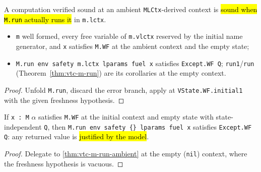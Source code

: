 \begin{theorem}
  \label{thm:vtc-m-run-ambient}
  \leanok

   A computation verified sound at an ambient \texttt{MLCtx}-derived context is
  \hl{sound when \texttt{M.run} actually runs it} in \texttt{m.lctx}.
  \begin{itemize}
  \item {} \texttt{m} well formed, every free variable of \texttt{m.vlctx} reserved by
    the initial name generator, and \texttt{x} satisfies \texttt{M.WF} at the ambient context and
    the empty state;
  \item {} \texttt{M.run env safety m.lctx lparams fuel x} satisfies
    \texttt{Except.WF Q}; \texttt{run1}/\texttt{run} (Theorem~\ref{thm:vtc-m-run}) are its
    corollaries at the empty context.
  \end{itemize}
\end{theorem}
\begin{proof}
  \leanok
   Unfold \texttt{M.run}, discard the error branch, apply at
  \texttt{VState.WF.initial1} with the given freshness hypothesis.
\end{proof}

\begin{theorem}
  \label{thm:vtc-m-run}
  \leanok

   If \texttt{x : M} $\alpha$ satisfies \texttt{M.WF} at the initial context and
  empty state with state-independent \texttt{Q}, then
  \texttt{M.run env safety \{\} lparams fuel x} satisfies \texttt{Except.WF Q}: any returned
  value is \hl{justified by the model}.
\end{theorem}
\begin{proof}
  \leanok
   Delegate to \ref{thm:vtc-m-run-ambient} at the empty (\texttt{nil}) context, where
  the freshness hypothesis is vacuous.
\end{proof}

